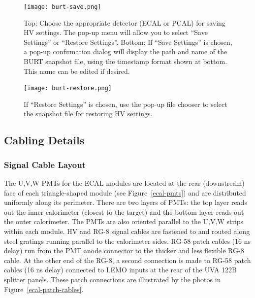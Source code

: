 \documentclass[letterpaper,10pt]{article}
\begin{document}
\begin{figure}[htbp]
  \centering
  \texttt{[image: burt-save.png]}
  \vspace{2mm}
  \caption{Top: Choose the appropriate detector (ECAL or PCAL) for saving HV settings.  The pop-up menu will
    allow you to select ``Save Settings'' or ``Restore Settings''.  Bottom: If ``Save Settings'' is chosen,
    a pop-up confirmation dialog will display the path and name of the BURT snapshot file, using the timestamp format shown at bottom.
    This name can be edited if desired.}
\label{backup-restore1}
\end{figure}
\begin{figure}[htbp]
  \centering
  \texttt{[image: burt-restore.png]}
  \vspace{2mm}
  \caption{If ``Restore Settings'' is chosen, use the pop-up file chooser to select the snapshot
    file for restoring HV settings.}
\label{backup-restore2}
\end{figure}
\subsection{Cabling Details}



\subsubsection{Signal Cable Layout}
\label{signal-conn}

The U,V,W PMTs for the ECAL modules are located at the rear (downstream) face of each triangle-shaped module
(see Figure~\ref{ecal-pmts}) and are distributed uniformly along its perimeter.  There are two layers of
PMTs: the top layer reads out the inner calorimeter (closest to the target) and the bottom layer reads out
the outer calorimeter. The PMTs are also oriented
parallel to the U,V,W strips within each module.  HV and RG-8 signal cables are fastened to and routed along steel gratings
running parallel to the calorimeter sides.  RG-58 patch cables (16 ns delay) run from the PMT anode connector
to the thicker and less flexible RG-8 cable.  At the other end of the RG-8, a second connection is made to
RG-58 patch cables (16 ns delay) connected to LEMO inputs at the rear of the UVA 122B splitter panels.  These
patch connections are illustrated by the photos in Figure~\ref{ecal-patch-cables}.
\end{document}
